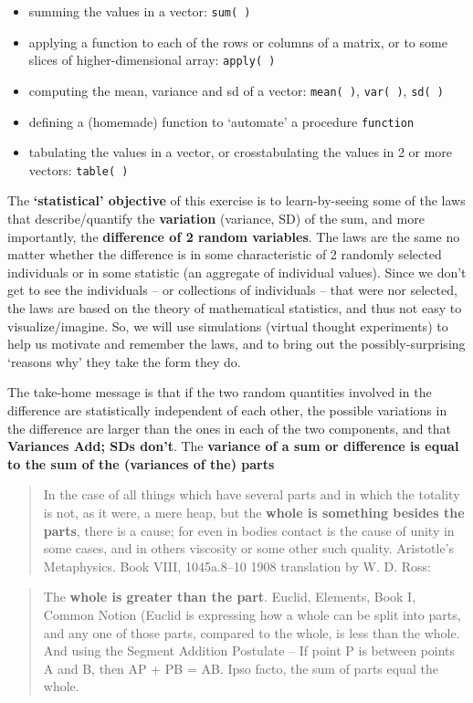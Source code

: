 \documentclass[]{book}
\begin{document}
\begin{itemize}
\item
  summing the values in a vector: \texttt{sum(\ )}
\item
  applying a function to each of the rows or columns of a matrix, or to some slices of higher-dimensional array: \texttt{apply(\ )}
\item
  computing the mean, variance and sd of a vector: \texttt{mean(\ )}, \texttt{var(\ )}, \texttt{sd(\ )}
\item
  defining a (homemade) function to `automate' a procedure \texttt{function}
\item
  tabulating the values in a vector, or crosstabulating the values in 2 or more vectors: \texttt{table(\ )}
\end{itemize}

The \textbf{`statistical' objective} of this exercise is to learn-by-seeing some of the laws that describe/quantify the \textbf{variation} (variance, SD) of the sum, and more importantly, the \textbf{difference of 2 random variables}. The laws are the same no matter whether the difference is in some characteristic of 2 randomly selected individuals or in some statistic (an aggregate of individual values). Since we don't get to see the individuals -- or collections of individuals -- that were nor selected, the laws are based on the theory of mathematical statistics, and thus not easy to visualize/imagine. So, we will use simulations (virtual thought experiments) to help us motivate and remember the laws, and to bring out the possibly-surprising `reasons why' they take the form they do.

The take-home message is that if the two random quantities involved in the difference are statistically independent of each other, the possible variations in the difference are larger than the ones in each of the two components, and that \textbf{Variances Add; SDs don't}. The \textbf{variance of a sum or difference is equal to the sum of the (variances of the) parts}

\begin{quote}
In the case of all things which have several parts and in which the totality is not, as it were, a mere heap, but the \textbf{whole is something besides the parts}, there is a cause; for even in bodies contact is the cause of unity in some cases, and in others viscosity or some other such quality. Aristotle's Metaphysics. Book VIII, 1045a.8--10 1908 translation by W. D. Ross:
\end{quote}

\begin{quote}
The \textbf{whole is greater than the part}. Euclid, Elements, Book I, Common Notion (Euclid is expressing how a whole can be split into parts, and any one of those parts, compared to the whole, is less than the whole. And using the Segment Addition Postulate -- If point P is between points A and B, then AP + PB = AB. Ipso facto, the sum of parts equal the whole.
\end{quote}
\end{document}
